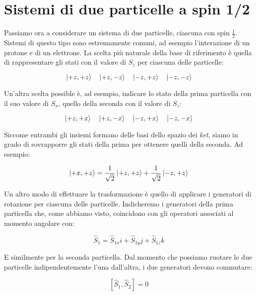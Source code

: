 \section{Sistemi di due particelle a spin 1/2}

	Passiamo ora a considerare un sistema di due particelle, ciascuna con spin $\tfrac{1}{2}$. Sistemi di questo tipo sono estremamente comuni, ad esempio l'interazione di un protone e di un elettrone. La scelta pi\`u naturale della base di riferimento \`e quella di rappresentare gli stati con il valore di $S_z$ per ciascuna delle particelle:

	\begin{equation}
		\ket{+z, +z} \quad \ket{+z, -z} \quad \ket{-z, +z} \quad \ket{-z, -z}
	\end{equation}	

Un'altra scelta possible \`e, ad esempio, indicare lo stato della prima particella con il suo valore di $S_x$, quello della seconda con il valore di $S_z$:

	\begin{equation}
		\ket{+z, +x} \quad \ket{+z, -x} \quad \ket{-z, +x} \quad \ket{-z, -x}
	\end{equation}

Siccome entrambi gli insiemi formano delle basi dello spazio dei \textit{ket}, siamo in grado di sovrapporre gli stati della prima per ottenere quelli della seconda. Ad esempio:

	\begin{equation}
		\ket{+x, +z} = \frac{1}{\sqrt{2}}\ket{+z, +z} + \frac{1}{\sqrt{2}}\ket{-z, +z}
	\end{equation}	

Un altro modo di effettuare la trasformazione \`e quello di applicare i generatori di rotazione per ciascuna delle particelle. Indicheremo i generatori della prima particella che, come abbiamo visto, coincidono con gli operatori associati al momento angolare con:

	\begin{equation}
		\hat{S}_1 = \hat{S}_{1x} i + \hat{S}_{1y} j + \hat{S}_{1z} k
	\end{equation}

E similmente per la seconda particella. Dal momento che possiamo ruotare le due particelle indipendentemente l'una dall'altra, i due generatori devono commutare:

	\begin{equation}
		\left [ \hat{S}_1, \hat{S}_2 \right ] = 0
	\end{equation}

